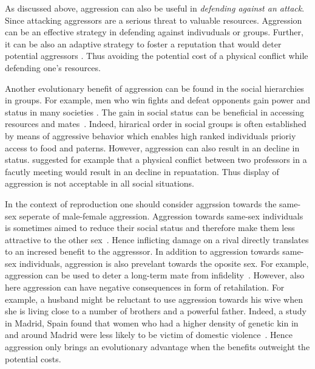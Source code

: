As discussed above, aggression can also be useful in \textit{defending against an attack}.
Since attacking aggressors are a serious threat to valuable resources.
Aggression can be an effective strategy in defending against indivuduals or groups.
Further, it can be also an adaptive strategy to foster a reputation that would deter potential aggressors \cite{Buss1997}.
Thus avoiding the potential cost of a physical conflict while defending one's resources.

Another evolutionary benefit of aggression can be found in the social hierarchies in groups.
For example, men who win fights and defeat opponents gain power and status in many societies \cite{Hill1996}.
The gain in social status can be beneficial in accessing resources and mates~\cite{Archer2009}.
Indeed, hirarical order in social groups is often established by means of aggressive behavior which enables high ranked individuals prioriy access to food and paterns\cite{Lindenfors2011}. 
However, aggression can also result in an decline in status.
\citet{Buss1997} suggested for example that a physical conflict between two professors in a facutly meeting would result in an decline in repuatation.
Thus display of aggression is not acceptable in all social situations.

In the context of reproduction one should consider aggrssion towards the same-sex seperate of male-female aggression.
Aggression towards same-sex individuals is sometimes aimed to reduce their social status and therefore make them less attractive to the other sex~\cite{Buss1990}.
Hence inflicting damage on a rival directly translates to an incresed benefit to the aggresssor.
In addition to aggression towards same-sex individuals, aggression is also prevelant towards the oposite sex.
For example, aggression can be used to deter a long-term mate from infidelity~\cite{Daly1982}.
However, also here aggression can have negative consequences in form of retahilation.
For example, a husband might be reluctant to use aggression towards his wive when she is living close to a number of brothers and a powerful father.
Indeed, a study in Madrid, Spain found that women who had a higher density of genetic kin in and around Madrid were less likely to be victim of domestic violence~\cite{Figueredo1995}.
Hence aggression only brings an evolutionary advantage when the benefits outweight the potential costs.

